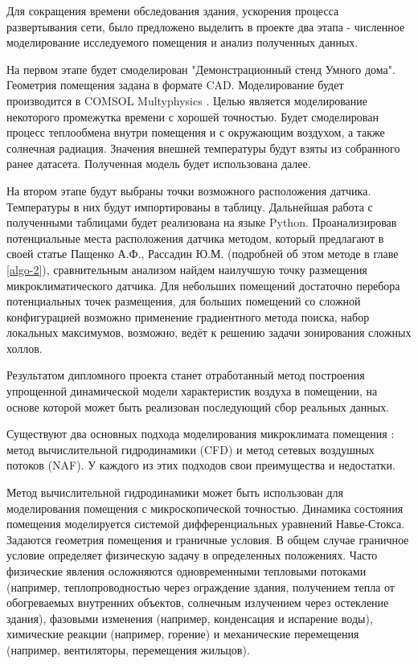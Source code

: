 Для сокращения времени обследования здания, ускорения процесса развертывания сети, было предложено выделить в проекте два этапа - численное моделирование исследуемого помещения и анализ полученных данных.

На первом этапе будет смоделирован "Демонстрационный стенд Умного дома". Геометрия помещения задана в формате CAD. Моделирование будет производится в COMSOL Multyphysics \cite{comsol}. Целью является моделирование некоторого промежутка времени с хорошей точностью. Будет смоделирован процесс теплообмена внутри помещения и с окружающим воздухом, а также солнечная радиация. Значения внешней температуры будут взяты из собранного ранее датасета. Полученная модель будет использована далее.

На втором этапе будут выбраны точки возможного расположения датчика. Температуры в них будут импортированы в таблицу. Дальнейшая работа с полученными таблицами будет реализована на языке Python. Проанализировав потенциальные места расположения датчика методом, который предлагают в своей статье Пащенко А.Ф., Рассадин Ю.М. \cite{pashchenko-rassadin} (подробней об этом методе в главе \ref{algo-2}), сравнительным анализом найдем наилучшую точку размещения микроклиматического датчика. Для небольших помещений достаточно перебора потенциальных точек размещения, для больших помещений со сложной конфигурацией возможно применение градиентного метода поиска, набор локальных максимумов, возможно, ведёт к решению задачи зонирования сложных холлов.

\newpage

Результатом дипломного проекта станет отработанный метод построения упрощенной динамической модели характеристик воздуха в помещении, на основе которой может быть реализован последующий сбор реальных данных.

\newpage


Существуют два основных подхода моделирования микроклимата помещения \cite{ashrae}: метод вычислительной гидродинамики (CFD) и метод сетевых воздушных потоков (NAF). У каждого из этих подходов свои преимущества и недостатки.

Метод вычислительной гидродинамики \cite{cfd} может быть использован для моделирования помещения с микроскопической точностью. Динамика состояния помещения моделируется системой дифференциальных уравнений Навье-Стокса. Задаются геометрия помещения и граничные условия. В общем случае граничное условие определяет физическую задачу в определенных положениях. Часто физические явления осложняются одновременными тепловыми потоками (например, теплопроводностью через ограждение здания, получением тепла от обогреваемых внутренних объектов, солнечным излучением через остекление здания), фазовыми изменения (например, конденсация и испарение воды), химические реакции (например, горение) и механические перемещения (например, вентиляторы, перемещения жильцов).

